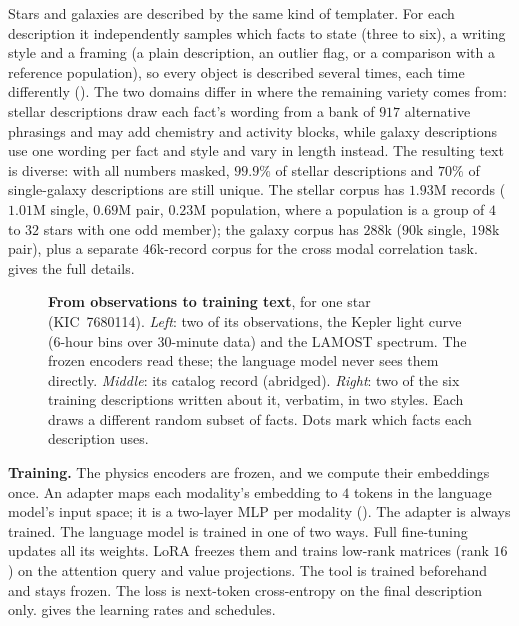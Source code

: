Stars and galaxies are described by the same kind of templater. For each
description it independently samples which facts to state (three to six), a
writing style and a framing (a plain description, an outlier flag, or a
comparison with a reference population), so every object is described several
times, each time differently (). The two domains differ in
where the remaining variety comes from: stellar descriptions draw each fact's
wording from a bank of $917$ alternative phrasings and may add chemistry and
activity blocks, while galaxy descriptions use one wording per fact and style
and vary in length instead. The resulting text is diverse: with all numbers
masked, $99.9\%$ of stellar descriptions and $70\%$ of single-galaxy
descriptions are still unique. The stellar corpus has $1.93$M records ($1.01$M
single, $0.69$M pair, $0.23$M population, where a population is a group of $4$
to $32$ stars with one odd member); the galaxy corpus has $288$k ($90$k single,
$198$k pair), plus a separate $46$k-record corpus for the cross modal correlation task.
 gives the full details.

\begin{figure}[t]
  \centering
  \resizebox{\textwidth}{!}{}
  \caption{\textbf{From observations to training text}, for one star
  (KIC~7680114). \emph{Left}: two of its observations, the Kepler light curve
  (6-hour bins over 30-minute data) and the LAMOST spectrum. The frozen encoders
  read these; the language model never sees them directly. \emph{Middle}: its
  catalog record (abridged). \emph{Right}: two of the six training descriptions
  written about it, verbatim, in two styles. Each draws a different random
  subset of facts. Dots mark which facts each description uses.}
  \label{fig:example}
\end{figure}

\textbf{Training.} The physics encoders are frozen, and we compute their embeddings once.
An adapter maps each modality's embedding to $4$ tokens in the language model's
input space; it is a two-layer MLP per modality (). The adapter is
always trained. The language model is trained in one of two ways. Full
fine-tuning updates all its weights. LoRA freezes them and trains low-rank
matrices (rank $16$) on the attention query and value projections. The tool is
trained beforehand and stays frozen. The loss is next-token cross-entropy on the
final description only.
 gives the learning rates and schedules.

